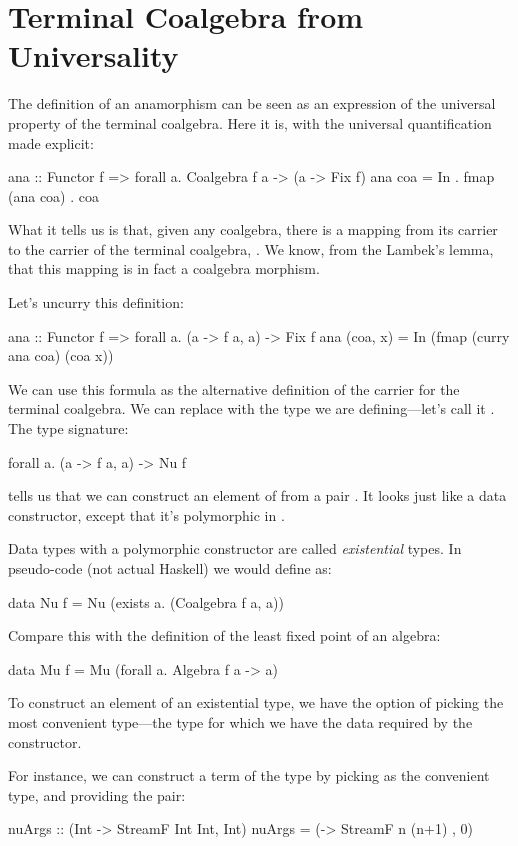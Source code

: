 \documentclass[DaoFP]{subfiles}
\begin{document}
\section{Terminal Coalgebra from Universality}

The definition of an anamorphism can be seen as an expression of the universal property of the terminal coalgebra. Here it is, with the universal quantification made explicit:
 \begin{haskell}
ana :: Functor f => forall a. Coalgebra f a -> (a -> Fix f)
ana coa = In . fmap (ana coa) . coa 
\end{haskell}
What it tells us is that, given any coalgebra, there is a mapping from its carrier to the carrier of the terminal coalgebra, . We know, from the Lambek's lemma, that this mapping is in fact a coalgebra morphism.

Let's uncurry this definition:
\begin{haskell}
ana :: Functor f => forall a. (a -> f a, a) -> Fix f
ana (coa, x) = In (fmap (curry ana coa) (coa x))
\end{haskell}
We can use this formula as the alternative definition of the carrier for the terminal coalgebra. We can replace  with the type we are defining---let's call it . The type signature:
\begin{haskell}
forall a. (a -> f a, a) -> Nu f
\end{haskell}
tells us that we can construct an element of  from a pair . It looks just like a data constructor, except that it's polymorphic in . 

Data types with a polymorphic constructor are called \emph{existential} types. In pseudo-code (not actual Haskell) we would define  as:
\begin{haskell}
data Nu f = Nu (exists a. (Coalgebra f a, a))
\end{haskell}
Compare this with the definition of the least fixed point of an algebra:
\begin{haskell}
data Mu f = Mu (forall a. Algebra f a -> a)
\end{haskell}


To construct an element of an existential type, we have the option of picking the most convenient type---the type for which we have the data required by the constructor. 

For instance, we can construct a term of the type  by picking  as the convenient type, and providing the pair:
\begin{haskell}
nuArgs :: (Int -> StreamF Int Int, Int)
nuArgs =  (\n -> StreamF n (n+1) , 0)
\end{haskell}
\end{document}
